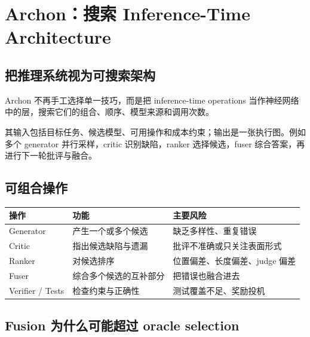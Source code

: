 \section{Archon：搜索 Inference-Time Architecture}

\subsection{把推理系统视为可搜索架构}

Archon 不再手工选择单一技巧，而是把 inference-time operations 当作神经网络中的层，搜索它们的组合、顺序、模型来源和调用次数。


其输入包括目标任务、候选模型、可用操作和成本约束；输出是一张执行图。例如多个 generator 并行采样，critic 识别缺陷，ranker 选择候选，fuser 综合答案，再进行下一轮批评与融合。

\subsection{可组合操作}


\begin{table}[H]
\centering
\small
\begin{tabular}{p{2.8cm}p{5.1cm}p{5.7cm}}
\toprule
\textbf{操作} & \textbf{功能} & \textbf{主要风险} \\
\midrule
Generator & 产生一个或多个候选 & 缺乏多样性、重复错误 \\
Critic & 指出候选缺陷与遗漏 & 批评不准确或只关注表面形式 \\
Ranker & 对候选排序 & 位置偏差、长度偏差、judge 偏差 \\
Fuser & 综合多个候选的互补部分 & 把错误也融合进去 \\
Verifier / Tests & 检查约束与正确性 & 测试覆盖不足、奖励投机 \\
\bottomrule
\end{tabular}
\end{table}

\subsection{Fusion 为什么可能超过 oracle selection}

